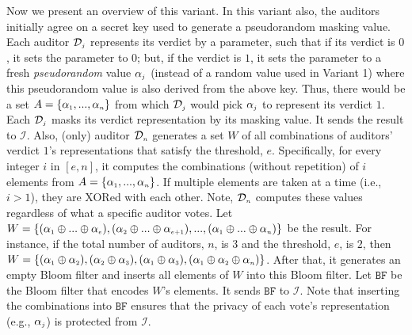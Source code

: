 Now we present an overview of this variant. In this variant also, the auditors initially agree on a secret key used to generate a pseudorandom masking value. Each auditor $\mathcal{D}_{\scriptscriptstyle j}$ represents its verdict by a parameter, such that if its verdict is $0$, it sets the parameter to  $0$; but, if the verdict is $1$, it sets the parameter to a fresh \emph{pseudorandom} value $\alpha_{\scriptscriptstyle j}$  (instead of a random value used in Variant 1) where this pseudorandom value is also derived from the above key.  Thus, there would be a set $A=\{\alpha_{\scriptscriptstyle 1},..., \alpha_{\scriptscriptstyle n}\}$ from which   $\mathcal{D}_{\scriptscriptstyle j}$ would pick $\alpha_{\scriptscriptstyle j}$ to represent its verdict $1$. Each $\mathcal{D}_{\scriptscriptstyle j}$ masks its verdict representation by its masking  value. It sends the result to $\mathcal{I}$. Also, (only) auditor $\mathcal{D}_{\scriptscriptstyle n}$  generates a set $W$  of all  combinations of auditors' verdict $1$'s representations that satisfy the threshold, $e$.  Specifically,  for every integer $i$ in $[e, n]$, it computes the combinations (without repetition) of $i$ elements from  $A=\{\alpha_{\scriptscriptstyle 1},..., \alpha_{\scriptscriptstyle n}\}$. If  multiple elements are taken at a time (i.e., $i>1$), they are XORed with each other.   Note, $\mathcal{D}_{\scriptscriptstyle n}$ computes these values    regardless of what a specific  auditor  votes.   Let $W=\{(\alpha_{\scriptscriptstyle 1}\oplus ... \oplus \alpha_{\scriptscriptstyle e}),  (\alpha_{\scriptscriptstyle 2}\oplus  ... \oplus \alpha_{\scriptscriptstyle e+1}), ..., (\alpha_{\scriptscriptstyle 1}\oplus ... \oplus \alpha_{\scriptscriptstyle n})\}$ be the result. For instance, if the total number of auditors, $n$, is $3$ and the threshold, $e$, is $2$,  then $W=\{(\alpha_{\scriptscriptstyle 1}\oplus \alpha_{\scriptscriptstyle 2}),  (\alpha_{\scriptscriptstyle 2}\oplus  \alpha_{\scriptscriptstyle 3}), (\alpha_{\scriptscriptstyle 1}\oplus \alpha_{\scriptscriptstyle 3}), (\alpha_{\scriptscriptstyle 1}\oplus \alpha_{\scriptscriptstyle 2} \oplus \alpha_{\scriptscriptstyle n})\}$. After that, it generates an empty Bloom filter and  inserts all elements of $W$ into this Bloom filter. Let $\mathtt{BF}$ be the Bloom filter that encodes $W$'s elements. It sends $\mathtt{BF}$ to $\mathcal{I}$. Note that inserting the combinations into $\mathtt{BF}$ ensures that the privacy of  each vote's representation (e.g., $\alpha_{\scriptscriptstyle j}$) is protected from $\mathcal{I}$. 





